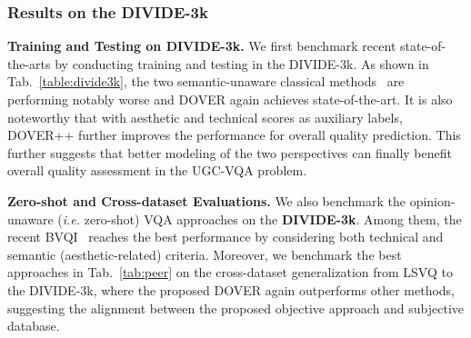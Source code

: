 \documentclass[10pt,twocolumn,letterpaper]{article}
\renewcommand{\paragraph}[1]{\noindent \textbf{#1}}
\begin{document}
\subsubsection{Results on the DIVIDE-3k}
\label{sec:evadivide}

\paragraph{Training and Testing on DIVIDE-3k.} We first benchmark recent state-of-the-arts by conducting training and testing in the DIVIDE-3k. As shown in Tab.~\ref{table:divide3k}, the two semantic-unaware classical methods~\cite{tlvqm,videval} are performing notably worse and DOVER again achieves state-of-the-art. It is also noteworthy that with aesthetic and technical scores as auxiliary labels, DOVER++ further improves the performance for overall quality prediction. This further suggests that better modeling of the two perspectives can finally benefit overall quality assessment in the UGC-VQA problem.


\paragraph{Zero-shot and Cross-dataset Evaluations.} We also benchmark the opinion-unaware (\textit{i.e.} zero-shot) VQA approaches on the \textbf{DIVIDE-3k}. Among them, the recent BVQI~\cite{buonavista} reaches the best performance by considering both technical and semantic (aesthetic-related) criteria. Moreover, we benchmark the best approaches in Tab.~\ref{tab:peer} on the cross-dataset generalization from LSVQ to the DIVIDE-3k, where the proposed DOVER again outperforms other methods, suggesting the alignment between the proposed objective approach and subjective database.
\end{document}

